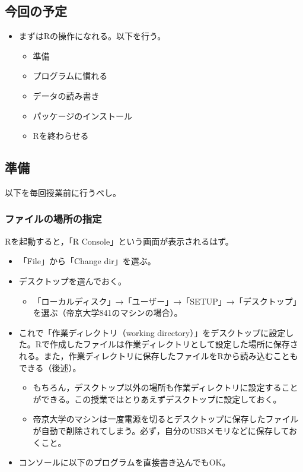 \documentclass[]{article}
\providecommand{\tightlist}{%
  \setlength{\itemsep}{0pt}\setlength{\parskip}{0pt}}
\begin{document}
\subsection{今回の予定}

\begin{itemize}
\tightlist
\item
  まずはRの操作になれる。以下を行う。

  \begin{itemize}
  \tightlist
  \item
    準備
  \item
    プログラムに慣れる
  \item
    データの読み書き
  \item
    パッケージのインストール
  \item
    Rを終わらせる
  \end{itemize}
\end{itemize}

\subsection{準備}

以下を毎回授業前に行うべし。

\subsubsection{ファイルの場所の指定}

Rを起動すると，「R Console」という画面が表示されるはず。

\begin{itemize}
\tightlist
\item
  「File」から「Change dir」を選ぶ。\\
\item
  デスクトップを選んでおく。

  \begin{itemize}
  \tightlist
  \item
    「ローカルディスク」→「ユーザー」→「SETUP」→「デスクトップ」を選ぶ（帝京大学841のマシンの場合）。
  \end{itemize}
\item
  これで「作業ディレクトリ（working
  directory）」をデスクトップに設定した。Rで作成したファイルは作業ディレクトリとして設定した場所に保存される。また，作業ディレクトリに保存したファイルをRから読み込むこともできる（後述）。

  \begin{itemize}
  \tightlist
  \item
    もちろん，デスクトップ以外の場所も作業ディレクトリに設定することができる。この授業ではとりあえずデスクトップに設定しておく。\\
  \item
    帝京大学のマシンは一度電源を切るとデスクトップに保存したファイルが自動で削除されてしまう。必ず，自分のUSBメモリなどに保存しておくこと。
  \end{itemize}
\item
  コンソールに以下のプログラムを直接書き込んでもOK。
\end{itemize}
\end{document}

